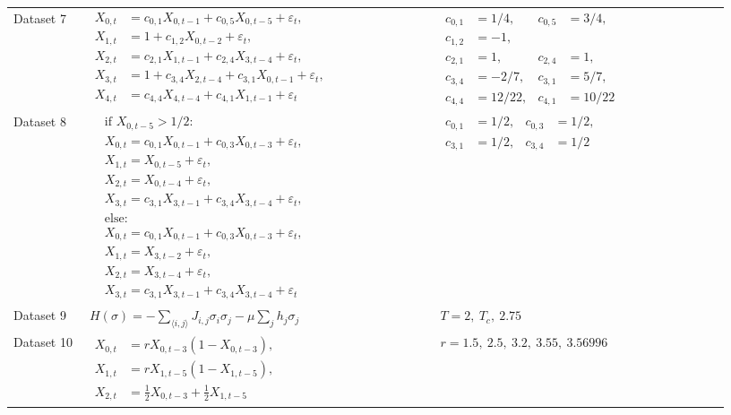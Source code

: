 \begin{landscape}
\begin{longtable}{@{}
>{\raggedright\arraybackslash}p{0.10\linewidth}
>{\raggedright\arraybackslash}p{0.46\linewidth}
>{\raggedright\arraybackslash}p{0.38\linewidth}@{}}
Dataset 7 &
$\begin{aligned}
X_{0,t}&=c_{0,1}X_{0,t-1}+c_{0,5}X_{0,t-5}+\varepsilon_t,\\
X_{1,t}&=1+c_{1,2}X_{0,t-2}+\varepsilon_t,\\
X_{2,t}&=c_{2,1}X_{1,t-1}+c_{2,4}X_{3,t-4}+\varepsilon_t,\\
X_{3,t}&=1+c_{3,4}X_{2,t-4}+c_{3,1}X_{0,t-1}+\varepsilon_t,\\
X_{4,t}&=c_{4,4}X_{4,t-4}+c_{4,1}X_{1,t-1}+\varepsilon_t
\end{aligned}$ &
$\begin{aligned}
c_{0,1}&=1/4,&c_{0,5}&=3/4,\\
c_{1,2}&=-1,\\
c_{2,1}&=1,&c_{2,4}&=1,\\
c_{3,4}&=-2/7,&c_{3,1}&=5/7,\\
c_{4,4}&=12/22,&c_{4,1}&=10/22
\end{aligned}$ \\

Dataset 8 &
$\begin{aligned}
&\text{if }X_{0,t-5}>1/2:\\
&X_{0,t}=c_{0,1}X_{0,t-1}+c_{0,3}X_{0,t-3}+\varepsilon_t,\\
&X_{1,t}=X_{0,t-5}+\varepsilon_t,\\
&X_{2,t}=X_{0,t-4}+\varepsilon_t,\\
&X_{3,t}=c_{3,1}X_{3,t-1}+c_{3,4}X_{3,t-4}+\varepsilon_t,\\
&\text{else:}\\
&X_{0,t}=c_{0,1}X_{0,t-1}+c_{0,3}X_{0,t-3}+\varepsilon_t,\\
&X_{1,t}=X_{3,t-2}+\varepsilon_t,\\
&X_{2,t}=X_{3,t-4}+\varepsilon_t,\\
&X_{3,t}=c_{3,1}X_{3,t-1}+c_{3,4}X_{3,t-4}+\varepsilon_t
\end{aligned}$ &
$\begin{aligned}
c_{0,1}&=1/2,&c_{0,3}&=1/2,\\
c_{3,1}&=1/2,&c_{3,4}&=1/2
\end{aligned}$ \\

Dataset 9 &
$H(\sigma)=-\sum_{\langle i,j\rangle}J_{i,j}\sigma_i\sigma_j
-\mu\sum_j h_j\sigma_j$ &
$T=2,\ T_c,\ 2.75$ \\

Dataset 10 &
$\begin{aligned}
X_{0,t}&=rX_{0,t-3}(1-X_{0,t-3}),\\
X_{1,t}&=rX_{1,t-5}(1-X_{1,t-5}),\\
X_{2,t}&=\tfrac12X_{0,t-3}+\tfrac12X_{1,t-5}
\end{aligned}$ &
$r=1.5,\ 2.5,\ 3.2,\ 3.55,\ 3.56996$ \\

\end{longtable}
\endgroup
\end{landscape}

